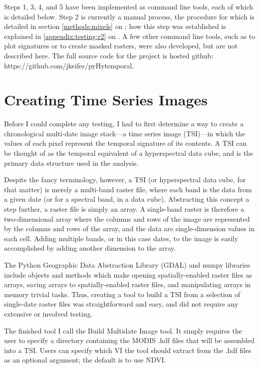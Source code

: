 Steps 1, 3, 4, and 5 have been implemented as command line tools, each of which is detailed below. Step 2 is currently a manual process, the procedure for which is detailed in section \autoref{methods:mixels} on ; how this step was established is explained in \autoref{appendix:testing:r2} on . A few other command line tools, such as to plot signatures or to create masked rasters, were also developed, but are not described here. The full source code for the project is hosted github: https://github.com/jkeifer/pyHytemporal. 

\section{Creating Time Series Images}
\label{appendix:tools:build}

Before I could complete any testing, I had to first determine a way to create a chronological multi-date image stack---a time series image (TSI)---in which the values of each pixel represent the temporal signature of its contents. A TSI can be thought of as the temporal equivalent of a hyperspectral data cube, and is the primary data structure used in the analysis.

Despite the fancy terminology, however, a TSI (or hyperspectral data cube, for that matter) is merely a multi-band raster file, where each band is the data from a given date (or for a spectral band, in a data cube). Abstracting this concept a step further, a raster file is simply an array. A single-band raster is therefore a two-dimensional array where the columns and rows of the image are represented by the columns and rows of the array, and the data are single-dimension values in each cell. Adding multiple bands, or in this case dates, to the image is easily accomplished by adding another dimension to the array.

The Python Geographic Data Abstraction Library (GDAL) and numpy libraries include objects and methods which make opening spatially-enabled raster files as arrays, saving arrays to spatially-enabled raster files, and manipulating arrays in memory trivial tasks. Thus, creating a tool to build a TSI from a selection of single-date raster files was straightforward and easy, and did not require any extensive or involved testing.

The finished tool I call the Build Multidate Image tool. It simply requires the user to specify a directory containing the MODIS .hdf files that will be assembled into a TSI. Users can specify which VI the tool should extract from the .hdf files as an optional argument; the default is to use NDVI.

